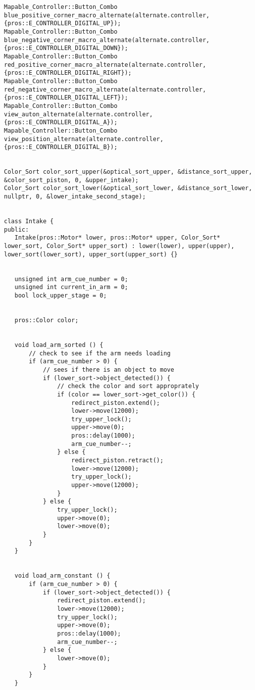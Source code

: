 \begin{verbatim}
Mapable_Controller::Button_Combo blue_positive_corner_macro_alternate(alternate.controller, {pros::E_CONTROLLER_DIGITAL_UP});
Mapable_Controller::Button_Combo blue_negative_corner_macro_alternate(alternate.controller, {pros::E_CONTROLLER_DIGITAL_DOWN});
Mapable_Controller::Button_Combo red_positive_corner_macro_alternate(alternate.controller, {pros::E_CONTROLLER_DIGITAL_RIGHT});
Mapable_Controller::Button_Combo red_negative_corner_macro_alternate(alternate.controller, {pros::E_CONTROLLER_DIGITAL_LEFT});
Mapable_Controller::Button_Combo view_auton_alternate(alternate.controller, {pros::E_CONTROLLER_DIGITAL_A});
Mapable_Controller::Button_Combo view_position_alternate(alternate.controller, {pros::E_CONTROLLER_DIGITAL_B});


Color_Sort color_sort_upper(&optical_sort_upper, &distance_sort_upper, &color_sort_piston, 0, &upper_intake);
Color_Sort color_sort_lower(&optical_sort_lower, &distance_sort_lower, nullptr, 0, &lower_intake_second_stage);


class Intake {
public:
   Intake(pros::Motor* lower, pros::Motor* upper, Color_Sort* lower_sort, Color_Sort* upper_sort) : lower(lower), upper(upper), lower_sort(lower_sort), upper_sort(upper_sort) {}


   unsigned int arm_cue_number = 0;
   unsigned int current_in_arm = 0;
   bool lock_upper_stage = 0;


   pros::Color color;


   void load_arm_sorted () {
       // check to see if the arm needs loading
       if (arm_cue_number > 0) {
           // sees if there is an object to move
           if (lower_sort->object_detected()) {
               // check the color and sort approprately
               if (color == lower_sort->get_color()) {
                   redirect_piston.extend();
                   lower->move(12000);
                   try_upper_lock();
                   upper->move(0);
                   pros::delay(1000);
                   arm_cue_number--;
               } else {
                   redirect_piston.retract();
                   lower->move(12000);
                   try_upper_lock();
                   upper->move(12000);
               }
           } else {
               try_upper_lock();
               upper->move(0);
               lower->move(0);
           }
       }
   }


   void load_arm_constant () {
       if (arm_cue_number > 0) {
           if (lower_sort->object_detected()) {
               redirect_piston.extend();
               lower->move(12000);
               try_upper_lock();
               upper->move(0);
               pros::delay(1000);
               arm_cue_number--;
           } else {
               lower->move(0);
           }
       }
   }



\end{verbatim}
